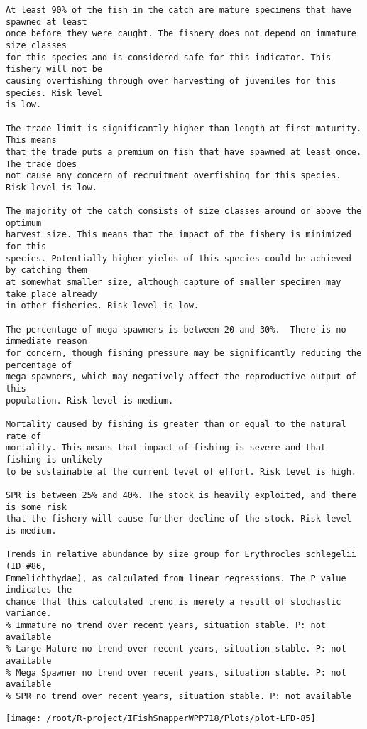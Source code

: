 \documentclass{report}\usepackage[]{graphicx}\usepackage[]{color}
\makeatletter
\def\maxwidth{ %
  \ifdim\Gin@nat@width>\linewidth
    \linewidth
  \else
    \Gin@nat@width
  \fi
}
\newenvironment{kframe}{%
 \def\at@end@of@kframe{}%
 \ifinner\ifhmode%
  \def\at@end@of@kframe{\end{minipage}}%
  \begin{minipage}{\columnwidth}%
 \fi\fi%
 \def\FrameCommand##1{\hskip\@totalleftmargin \hskip-\fboxsep
 \colorbox{shadecolor}{##1}\hskip-\fboxsep
     \hskip-\linewidth \hskip-\@totalleftmargin \hskip\columnwidth}%
 \MakeFramed {\advance\hsize-\width
   \@totalleftmargin\z@ \linewidth\hsize
   \@setminipage}}%
 {\par\unskip\endMakeFramed%
 \at@end@of@kframe}
\newenvironment{knitrout}{}{} %
\makeatother
\begin{document}
\begin{knitrout}
\begin{kframe}
\begin{verbatim}
At least 90% of the fish in the catch are mature specimens that have spawned at least
once before they were caught. The fishery does not depend on immature size classes
for this species and is considered safe for this indicator. This fishery will not be
causing overfishing through over harvesting of juveniles for this species. Risk level
is low.

The trade limit is significantly higher than length at first maturity.  This means
that the trade puts a premium on fish that have spawned at least once. The trade does
not cause any concern of recruitment overfishing for this species. Risk level is low.

The majority of the catch consists of size classes around or above the optimum
harvest size. This means that the impact of the fishery is minimized for this
species. Potentially higher yields of this species could be achieved by catching them
at somewhat smaller size, although capture of smaller specimen may take place already
in other fisheries. Risk level is low.

The percentage of mega spawners is between 20 and 30%.  There is no immediate reason
for concern, though fishing pressure may be significantly reducing the percentage of
mega-spawners, which may negatively affect the reproductive output of this
population. Risk level is medium.
 
Mortality caused by fishing is greater than or equal to the natural rate of
mortality. This means that impact of fishing is severe and that fishing is unlikely
to be sustainable at the current level of effort. Risk level is high.
 
SPR is between 25% and 40%. The stock is heavily exploited, and there is some risk
that the fishery will cause further decline of the stock. Risk level is medium.
 
Trends in relative abundance by size group for Erythrocles schlegelii (ID #86,
Emmelichthydae), as calculated from linear regressions. The P value indicates the
chance that this calculated trend is merely a result of stochastic variance.
% Immature no trend over recent years, situation stable. P: not available
% Large Mature no trend over recent years, situation stable. P: not available
% Mega Spawner no trend over recent years, situation stable. P: not available
% SPR no trend over recent years, situation stable. P: not available
\end{verbatim}
\end{kframe}
\texttt{[image: /root/R-project/IFishSnapperWPP718/Plots/plot-LFD-85]} 


\end{knitrout}
\end{document}
